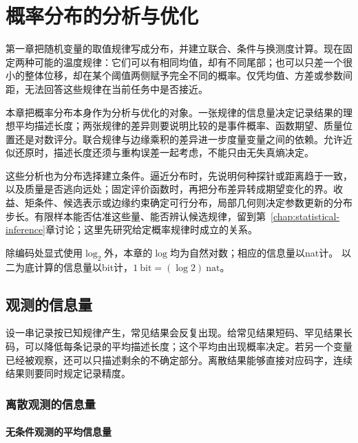 \chapter{概率分布的分析与优化}
\label{chap:information-theory-and-statistical-geometry}

第一章把随机变量的取值规律写成分布，并建立联合、条件与换测度计算。现在固定两种可能的温度规律：它们可以有相同均值，却有不同尾部；也可以只差一个很小的整体位移，却在某个阈值两侧赋予完全不同的概率。仅凭均值、方差或参数间距，无法回答这些规律在当前任务中是否接近。

本章把概率分布本身作为分析与优化的对象。一张规律的信息量决定记录结果的理想平均描述长度；两张规律的差异则要说明比较的是事件概率、函数期望、质量位置还是对数评分。联合规律与边缘乘积的差异进一步度量变量之间的依赖。允许近似还原时，描述长度还须与重构误差一起考虑，不能只由无失真熵决定。

这些分析也为分布选择建立条件。逼近分布时，先说明何种探针或距离趋于一致，以及质量是否逃向远处；固定评价函数时，再把分布差异转成期望变化的界。收益、矩条件、候选表示或边缘约束确定可行分布，局部几何则决定参数更新的分布步长。有限样本能否估准这些量、能否辨认候选规律，留到第~\ref{chap:statistical-inference}章讨论；这里先研究给定概率规律时成立的关系。

除编码处显式使用\(\log_2\)外，本章的\(\log\)均为自然对数；相应的信息量以nat计。
以二为底计算的信息量以bit计，\(1\ \mathrm{bit}=(\log2)\ \mathrm{nat}\)。

\section{观测的信息量}
\label{sec:information-uncertainty-prediction}

设一串记录按已知规律产生，常见结果会反复出现。给常见结果短码、罕见结果长码，可以降低每条记录的平均描述长度；这个平均由出现概率决定。若另一个变量已经被观察，还可以只描述剩余的不确定部分。离散结果能够直接对应码字，连续结果则要同时规定记录精度。

\subsection{离散观测的信息量}
\label{sec:information-entropy}

\subsubsection{无条件观测的平均信息量}
\label{sec:information-unconditional-information}

